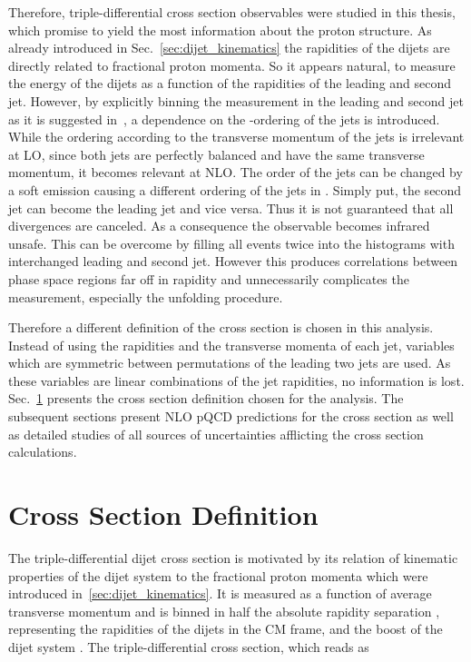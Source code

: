 Therefore, triple-differential cross section observables were studied in this
thesis, which promise to yield the most information about the proton structure.
As already introduced in Sec.~\ref{sec:dijet_kinematics} the rapidities of the
dijets are directly related to fractional proton momenta. So it appears natural,
to measure the energy of the dijets as a function of the rapidities of the
leading and second jet. However, by explicitly binning the measurement in the
leading and second jet as it is suggested in~\cite{Giele:1994xd}, a dependence
on the \pt-ordering of the jets is introduced. While the ordering according to the
transverse momentum of the jets is irrelevant at LO, since both jets are
perfectly balanced and have the same transverse momentum, it becomes relevant at
NLO. The order of the jets can be changed by a soft emission causing a different
ordering of the jets in \pt. Simply put, the second jet can become the leading
jet and vice versa. Thus it is not guaranteed that all divergences are canceled.
As a consequence the observable becomes infrared unsafe. This can be overcome by
filling all events twice into the histograms with interchanged leading and
second jet. However this produces correlations between phase space regions far
off in rapidity and unnecessarily complicates the measurement, especially the
unfolding procedure.

Therefore a different definition of the cross section is chosen in this
analysis. Instead of using the rapidities and the transverse momenta of each
jet, variables which are symmetric between permutations of the leading two
jets are used. As these variables are linear combinations of the jet rapidities,
no information is lost. Sec.~\ref{sec:crosssection_definition} presents the
cross section definition chosen for the analysis. The subsequent sections  present
NLO pQCD predictions for the cross section as well as detailed studies of all
sources of uncertainties afflicting the cross section calculations.

\section{Cross Section Definition}
\label{sec:crosssection_definition}

The triple-differential dijet cross section is motivated by its relation of
kinematic properties of the dijet system to the fractional proton momenta which
were introduced in~\ref{sec:dijet_kinematics}. It is measured as a function
of average transverse momentum \ptavg and is binned in half the absolute
rapidity separation \ystar, representing the rapidities of the dijets in the CM
frame, and the boost of the dijet system \yboost. The triple-differential cross
section, which reads as

